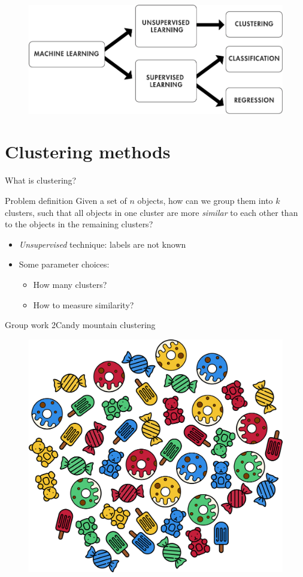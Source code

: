 \documentclass[aspectratio=169]{beamer}
\begin{document}
  \begin{frame}{}
    \begin{figure}
      \includegraphics[width=0.75\linewidth]{Figures/Machine_learning_pipeline}
    \end{figure}
  \end{frame}

  \section{Clustering methods}

  \begin{frame}{What is clustering?}

    \begin{block}{Problem definition}
      Given a set of $n$ objects, how can we group them into $k$
      clusters, such that all objects in one cluster are more
      \emph{similar} to each other than to the objects in the
      remaining clusters?
    \end{block}

    \vfill

    \begin{itemize}
      \item \emph{Unsupervised} technique: labels are not known
      \item Some parameter choices:
        \begin{itemize}
          \item How many clusters?
          \item How to measure similarity?
        \end{itemize}
    \end{itemize}
  \end{frame}

  \begin{frame}{Group work 2}{Candy mountain clustering}
    \begin{figure}
      \includegraphics[width=0.50\linewidth]{Figures/Candy_mountain}
    \end{figure}
  \end{frame}
\end{document}
